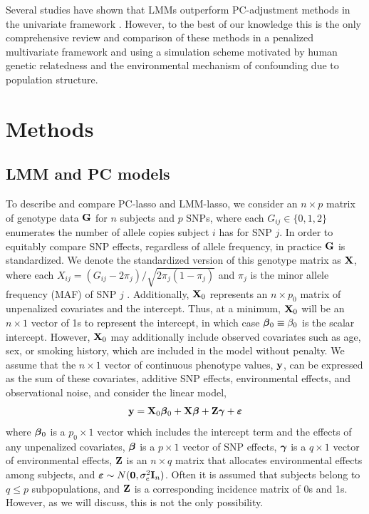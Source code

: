 Several studies have shown that LMMs outperform PC-adjustment methods in the univariate framework \citep{wang2013analytical, kang2010variance, zhao2007arabidopsis}. However, to the best of our knowledge this is the only comprehensive review and comparison of these methods in a penalized multivariate framework and using a simulation scheme motivated by human genetic relatedness and the environmental mechanism of confounding due to population structure.\\

\section{Methods} \label{sec:methods}



\subsection{LMM and PC models}
\label{Sec:lmm-and-pc}

To describe and compare PC-lasso and LMM-lasso, we consider an $n \times p$ matrix of genotype data $\mathbf{G}$ for $n$ subjects and $p$ SNPs, where each $G_{ij} \in \{ 0, 1, 2 \}$ enumerates the number of allele copies subject $i$ has for SNP $j$. In order to equitably compare SNP effects, regardless of allele frequency, in practice $\mathbf{G}$ is standardized. We denote the standardized version of this genotype matrix as $\mathbf{X}$, where each $X_{ij} = (G_{ij} - 2 \pi_j) / \sqrt{2\pi_j (1 - \pi_j)}$ and $\pi_j$ is the minor allele frequency (MAF) of SNP $j$ \citep{zhang2015principal, price2006principal}. Additionally, $\mathbf{X}_0$ represents an $n \times p_0$ matrix of unpenalized covariates and the intercept. Thus, at a minimum, $\mathbf{X}_0$ will be an $n \times 1$ vector of 1s to represent the intercept, in which case $\boldsymbol{\beta}{}_0 \equiv \beta_0$ is the scalar intercept. However, $\mathbf{X}_0$ may additionally include observed covariates such as age, sex, or smoking history, which are included in the model without penalty. We assume that the $n \times 1$ vector of continuous phenotype values, $\mathbf{y}$, can be expressed as the sum of these covariates, additive SNP effects, environmental effects, and observational noise, and consider the linear model,
\begin{equation}
    \label{eqn:model}
    \mathbf{y} = \mathbf{X}_0 \boldsymbol{\beta}{}_0 + \mathbf{X}\boldsymbol{\beta}{} + \mathbf{Z}\boldsymbol{\gamma} + \boldsymbol{\varepsilon}{}
\end{equation}
where $\boldsymbol{\beta}{}_0$ is a $p_0 \times 1$ vector which includes the intercept term and the effects of any unpenalized covariates, $\boldsymbol{\beta}{}$ is a $p \times 1$ vector of SNP effects, $\boldsymbol{\gamma}$ is a $q \times 1$ vector of environmental effects, $\mathbf{Z}$ is an $n \times q$ matrix that allocates environmental effects among subjects, and $\boldsymbol{\varepsilon}{} \sim N(\boldsymbol{0}, \sigma^2_e \mathbf{I}_n)$. Often it is assumed that subjects belong to $q \le p$ subpopulations, and $\mathbf{Z}$ is a corresponding incidence matrix of 0s and 1s. However, as we will discuss, this is not the only possibility.

